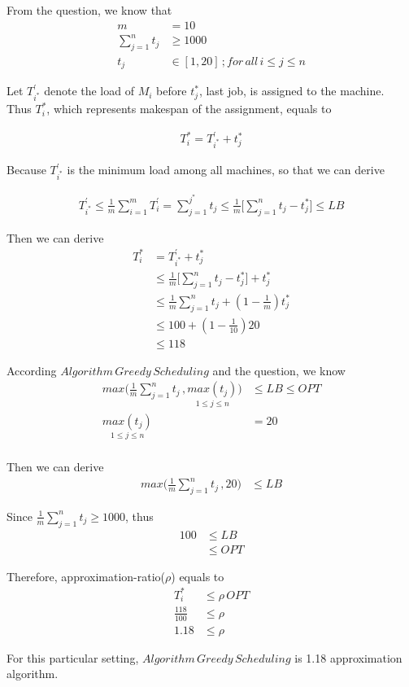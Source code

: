 \documentclass[12pt]{article}
\begin{document}
From the question, we know that
\begin{align*}
m &= 10\\
\sum\limits_{j=1}^n t_j &\ge 1000 \\
t_j  &\in [1,20] \,; for \, all \, i \le j \le n 
\end{align*}

Let $T^{\prime}_{i^*}$ denote the load of $M_i$ before $t_j^*$, last job, is assigned to the machine. \\
Thus $T_i^*$, which represents makespan of the assignment, equals to

\begin{align*}
T_i^* = T^{\prime}_{i^*} + t_j^*
\end{align*}

Because $T^{\prime}_{i^*}$ is the minimum load among all machines, so that we can derive

\begin{align*}
T^{\prime}_{i^*} \le \frac{1}{m}\sum\limits_{i=1}^m T^{\prime}_i = \sum\limits_{j=1}^{j^*} t_j \le \frac{1}{m} \bigg[ \sum\limits_{j=1}^n t_j - t_j^*  \bigg] \le LB
\end{align*}

Then we can derive
\begin{align*}
T_i^* &= T^{\prime}_{i^*} + t_j^* \\
&\le \frac{1}{m} \bigg[ \sum\limits_{j=1}^n t_j - t_j^*  \bigg] + t_j^* \\
&\le \frac{1}{m} \sum\limits_{j=1}^n t_j + ( 1 - \frac{1}{m} ) t_j^* \\
&\le 100 + ( 1 - \frac{1}{10} ) 20 \\
&\le 118
\end{align*}

According $Algorithm\, Greedy\, Scheduling$ and the question, we know
\begin{align*}
max \bigg( \frac{1}{m}\sum\limits_{j=1}^n t_j \, , \underset{1\le j \le n }{max(t_j) }\bigg) &\le LB \le OPT \\
\underset{1\le j \le n }{max(t_j)} &= 20 \\
\end{align*}

Then we can derive
\begin{align*}
max \bigg( \frac{1}{m}\sum\limits_{j=1}^n t_j \, , 20 \bigg) &\le LB
\end{align*}

Since $\frac{1}{m}\sum\limits_{j=1}^n t_j \ge 1000$, thus
\begin{align*}
100 &\le LB \\
&\le OPT
\end{align*}

Therefore, approximation-ratio($\rho$) equals to
\begin{align*}
T_i^* &\le \rho \, OPT \\
\frac{118}{100} &\le \rho \\
1.18 &\le \rho 
\end{align*}

For this particular setting, $Algorithm \,Greedy \,Scheduling$ is 1.18 approximation algorithm.
\end{document}
